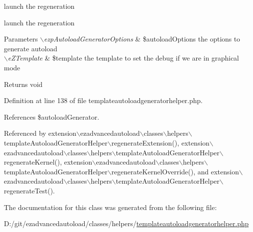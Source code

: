 launch the regeneration 

launch the regeneration


\begin{DoxyParams}{\-Parameters}
{\em $\backslash$ezp\-Autoload\-Generator\-Options} & \$autoload\-Options the options to generate autoload \\
\hline
{\em $\backslash$e\-Z\-Template} & \$template the template to set the debug if we are in graphical mode \\
\hline
\end{DoxyParams}
\begin{DoxyReturn}{\-Returns}
void 
\end{DoxyReturn}


\-Definition at line 138 of file templateautoloadgeneratorhelper.\-php.



\-References \$autoload\-Generator.



\-Referenced by extension$\backslash$ezadvancedautoload$\backslash$classes$\backslash$helpers$\backslash$template\-Autoload\-Generator\-Helper$\backslash$regenerate\-Extension(), extension$\backslash$ezadvancedautoload$\backslash$classes$\backslash$helpers$\backslash$template\-Autoload\-Generator\-Helper$\backslash$regenerate\-Kernel(), extension$\backslash$ezadvancedautoload$\backslash$classes$\backslash$helpers$\backslash$template\-Autoload\-Generator\-Helper$\backslash$regenerate\-Kernel\-Override(), and extension$\backslash$ezadvancedautoload$\backslash$classes$\backslash$helpers$\backslash$template\-Autoload\-Generator\-Helper$\backslash$regenerate\-Test().



\-The documentation for this class was generated from the following file\-:\begin{DoxyCompactItemize}
\item 
\-D\-:/git/ezadvancedautoload/classes/helpers/\hyperlink{templateautoloadgeneratorhelper_8php}{templateautoloadgeneratorhelper.\-php}\end{DoxyCompactItemize}
